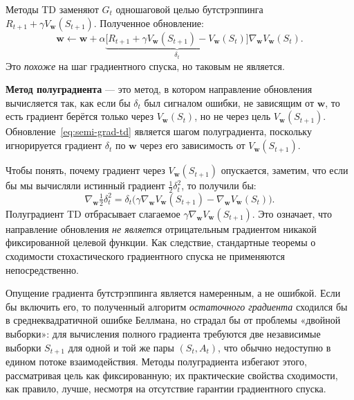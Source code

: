 Методы TD заменяют $G_t$ одношаговой целью бутстрэппинга $R_{t+1} + \gamma V_\mathbf{w}(S_{t+1})$.  Полученное обновление:
\begin{equation}
\label{eq:semi-grad-td}
\mathbf{w} \leftarrow \mathbf{w} + \alpha\underbrace{\bigl[R_{t+1} + \gamma V_\mathbf{w}(S_{t+1}) - V_\mathbf{w}(S_t)\bigr]}_{\delta_t}\nabla_\mathbf{w} V_\mathbf{w}(S_t).
\end{equation}
Это \emph{похоже} на шаг градиентного спуска, но таковым не является.

\begin{definition}
\label{def:semi-gradient}
\textbf{Метод полуградиента} --- это метод, в котором направление обновления вычисляется так, как если бы $\delta_t$ был сигналом ошибки, не зависящим от $\mathbf{w}$, то есть градиент берётся только через $V_\mathbf{w}(S_t)$, но не через цель $V_\mathbf{w}(S_{t+1})$.  Обновление~\eqref{eq:semi-grad-td} является шагом полуградиента, поскольку игнорируется градиент $\delta_t$ по $\mathbf{w}$ через его зависимость от $V_\mathbf{w}(S_{t+1})$.
\end{definition}

Чтобы понять, почему градиент через $V_\mathbf{w}(S_{t+1})$ опускается, заметим, что если бы мы вычисляли истинный градиент $\frac{1}{2}\delta_t^2$, то получили бы:
\[
\nabla_\mathbf{w}\tfrac{1}{2}\delta_t^2
= \delta_t\bigl(\gamma\nabla_\mathbf{w}V_\mathbf{w}(S_{t+1}) - \nabla_\mathbf{w}V_\mathbf{w}(S_t)\bigr).
\]
Полуградиент TD отбрасывает слагаемое $\gamma\nabla_\mathbf{w}V_\mathbf{w}(S_{t+1})$.  Это означает, что направление обновления \emph{не является} отрицательным градиентом никакой фиксированной целевой функции.  Как следствие, стандартные теоремы о сходимости стохастического градиентного спуска не применяются непосредственно.

\begin{remark}
\label{rem:semi-grad-motivation}
Опущение градиента бутстрэппинга является намеренным, а не ошибкой.  Если бы включить его, то полученный алгоритм \emph{остаточного градиента} сходился бы в среднеквадратичной ошибке Беллмана, но страдал бы от проблемы «двойной выборки»: для вычисления полного градиента требуются две независимые выборки $S_{t+1}$ для одной и той же пары $(S_t, A_t)$, что обычно недоступно в едином потоке взаимодействия.  Методы полуградиента избегают этого, рассматривая цель как фиксированную; их практические свойства сходимости, как правило, лучше, несмотря на отсутствие гарантии градиентного спуска.
\end{remark}

